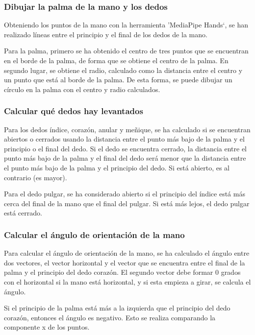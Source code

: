 \documentclass[12pt]{article}
\begin{document}
\subsubsection*{Dibujar la palma de la mano y los dedos}

Obteniendo los puntos de la mano con la herramienta 'MediaPipe Hands`, se han realizado líneas entre el principio y el final de los dedos de la mano. 

Para la palma, primero se ha obtenido el centro de tres puntos que se encuentran en el borde de la palma, de forma que se obtiene el centro de la palma. En segundo lugar, se obtiene el radio, calculado como la distancia entre el centro y un punto que está al borde de la palma. De esta forma, se puede dibujar un círculo en la palma con el centro y radio calculados.

\subsubsection*{Calcular qué dedos hay levantados}

Para los dedos índice, corazón, anular y meñique, se ha calculado si se encuentran abiertos o cerrados usando la distancia entre el punto más bajo de la palma y el principio o el final del dedo. Si el dedo se encuentra cerrado, la distancia entre el punto más bajo de la palma y el final del dedo será menor que la distancia entre el punto más bajo de la palma y el principio del dedo. Si está abierto, es al contrario (es mayor).

Para el dedo pulgar, se ha considerado abierto si el principio del índice está más cerca del final de la mano que el final del pulgar. Si está más lejos, el dedo pulgar está cerrado.

\subsubsection*{Calcular el ángulo de orientación de la mano}

Para calcular el ángulo de orientación de la mano, se ha calculado el ángulo entre dos vectores, el vector horizontal y el vector que se encuentra entre el final de la palma y el principio del dedo corazón. El segundo vector debe formar 0 grados con el horizontal si la mano está horizontal, y si esta empieza a girar, se calcula el ángulo.

Si el principio de la palma está más a la izquierda que el principio del dedo corazón, entonces el ángulo es negativo. Esto se realiza comparando la componente x de los puntos.
\end{document}
